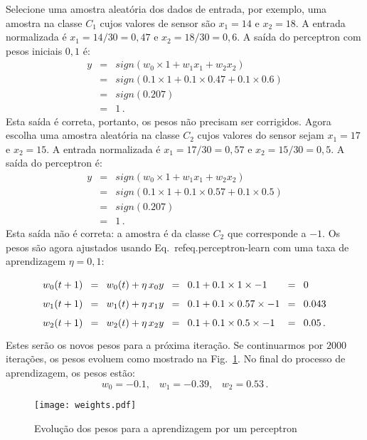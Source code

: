 Selecione uma amostra aleatória dos dados de entrada, por exemplo, uma amostra na classe $C_1$ cujos valores de sensor são $x_{1}=14$ e $x_{2}=18$. A entrada normalizada é $x_{1}=14/30=0,47$ e $x_{2}=18/30=0,6$. A saída do perceptron com pesos iniciais $0,1$ é:
\begin{eqnarray*}
y &=& \mathit{sign}(w_0\times 1 + w_1x_1 + w_2x_2)\\
&=& \mathit{sign}(0.1\times 1 + 0.1\times 0.47 + 0.1\times 0.6)\\
&=& \mathit{sign}(0.207)\\
&=& 1\,.
\end{eqnarray*}
Esta saída é correta, portanto, os pesos não precisam ser corrigidos. Agora escolha uma amostra aleatória na classe $C_2$ cujos valores do sensor sejam $x_{1}=17$ e $x_{2}=15$. A entrada normalizada é $x_{1}=17/30=0,57$ e $x_{2}=15/30=0,5$. A saída do perceptron é:
\begin{eqnarray*}
y &=& \mathit{sign}(w_0\times 1 + w_1x_1 + w_2x_2)\\
&=& \mathit{sign}(0.1\times 1 + 0.1\times 0.57 + 0.1\times 0.5)\\
&=& \mathit{sign}(0.207)\\
&=& 1\,.
\end{eqnarray*}
Esta saída não é correta: a amostra é da classe $C_2$ que corresponde a $-1$. Os pesos são agora ajustados usando Eq.~ref{eq.perceptron-learn} com uma taxa de aprendizagem $\eta = 0,1$:
\[
\spacearray
\begin{array}{lclclcl}
w_0(t+1) &=& w_0(t) + \eta \,x_0 y &=& 0.1 + 0.1\times 1\times -1 &=& 0 \\
w_1(t+1) &=& w_1(t) + \eta \,x_1 y &=& 0.1 + 0.1\times 0.57\times-1 &=& 0.043 \\
w_2(t+1) &=& w_2(t) + \eta \,x_2 y &=& 0.1 + 0.1\times 0.5\times -1 &=& 0.05\,.
\end{array}
\]
Estes serão os novos pesos para a próxima iteração. Se continuarmos por $2000$ iterações, os pesos evoluem como mostrado na Fig.~\ref{fig.weights-fixeta}. No final do processo de aprendizagem, os pesos estão:
\[
w_0 = -0.1,\;\;\; w_1 = -0.39,\;\;\; w_2 = 0.53\,.
\]

\begin{figure}[bt]
\begin{center}
\texttt{[image: weights.pdf]}
\end{center}
\caption{Evolução dos pesos para a aprendizagem por um perceptron}\label{fig.weights-fixeta}
\end{figure}

